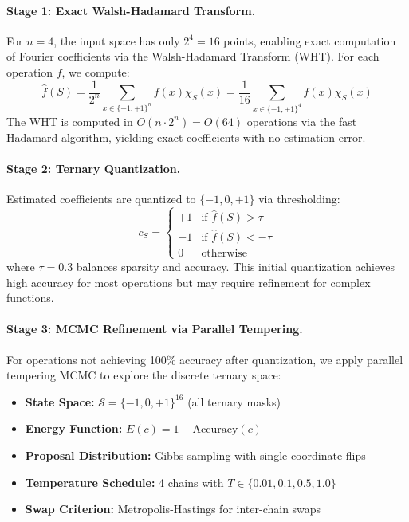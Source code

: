 \documentclass[Royal,times,sageh]{sagej}
\begin{document}
\paragraph{Stage 1: Exact Walsh-Hadamard Transform.}
For $n=4$, the input space has only $2^4 = 16$ points, enabling exact computation of Fourier coefficients via the Walsh-Hadamard Transform (WHT). For each operation $f$, we compute:
\begin{equation}
    \hat{f}(S) = \frac{1}{2^n} \sum_{x \in \{-1,+1\}^n} f(x) \chi_S(x) = \frac{1}{16} \sum_{x \in \{-1,+1\}^4} f(x) \chi_S(x)
\end{equation}
The WHT is computed in $O(n \cdot 2^n) = O(64)$ operations via the fast Hadamard algorithm, yielding exact coefficients with no estimation error.

\paragraph{Stage 2: Ternary Quantization.}
Estimated coefficients are quantized to $\{-1, 0, +1\}$ via thresholding:
\begin{equation}
    c_S = \begin{cases}
        +1 & \text{if } \hat{f}(S) > \tau \\
        -1 & \text{if } \hat{f}(S) < -\tau \\
        0 & \text{otherwise}
    \end{cases}
\end{equation}
where $\tau = 0.3$ balances sparsity and accuracy. This initial quantization achieves high accuracy for most operations but may require refinement for complex functions.

\paragraph{Stage 3: MCMC Refinement via Parallel Tempering.}
For operations not achieving 100\% accuracy after quantization, we apply parallel tempering MCMC \cite{swendsen1986replica} to explore the discrete ternary space:

\begin{itemize}
    \item \textbf{State Space:} $\mathcal{S} = \{-1, 0, +1\}^{16}$ (all ternary masks)
    \item \textbf{Energy Function:} $E(c) = 1 - \text{Accuracy}(c)$
    \item \textbf{Proposal Distribution:} Gibbs sampling with single-coordinate flips
    \item \textbf{Temperature Schedule:} 4 chains with $T \in \{0.01, 0.1, 0.5, 1.0\}$
    \item \textbf{Swap Criterion:} Metropolis-Hastings for inter-chain swaps
\end{itemize}
\end{document}
